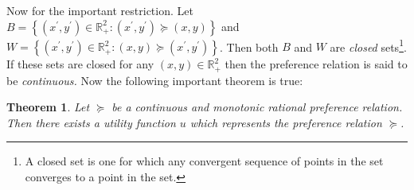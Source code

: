 \documentclass[12pt]{article}
\newtheorem{theorem}{Theorem}
\begin{document}
Now for the important restriction. Let $B=\left\{  \left(  x^{\prime
},y^{\prime}\right)  \in\mathbb{R}_{+}^{2}:\left(  x^{\prime},y^{\prime
}\right)  \succeq\left(  x,y\right)  \right\}  $ and $W=\left\{  \left(
x^{\prime},y^{\prime}\right)  \in\mathbb{R}_{+}^{2}:\left(  x,y\right)
\succeq\left(  x^{\prime},y^{\prime}\right)  \right\}  $. Then both $B$ and
$W$ are \emph{closed} sets\footnote{A closed set is one for which any
convergent sequence of points in the set converges to a point in the set.}. If
these sets are closed for any $\left(  x,y\right)  \in\mathbb{R}_{+}^{2}$ then
the preference relation is said to be \emph{continuous. }Now the following
important theorem is true:

\begin{theorem}
Let $\succeq$ be a continuous and monotonic rational preference relation. Then
there exists a utility function $u$ which represents the preference relation
$\succeq$.
\end{theorem}
\end{document}
